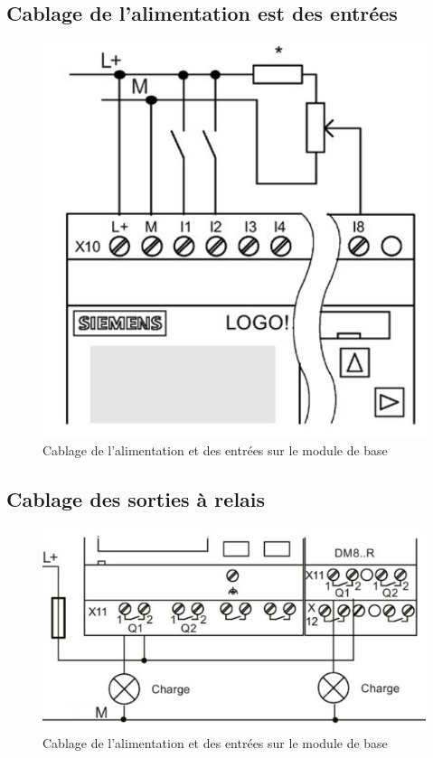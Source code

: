\subsection{Cablage de l'alimentation est des entrées}
\begin{figure}[h!]
    \centering
    \includegraphics[width=\textwidth,height=.3\textheight,keepaspectratio]{images/cablage_alimentation_entrees.png}
    \caption{Cablage de l'alimentation et des entrées sur le module de base}
\end{figure}

\subsection{Cablage des sorties à relais}
\begin{figure}[h!]
    \centering
    \includegraphics[width=\textwidth,height=.3\textheight,keepaspectratio]{images/cablage_sorties_relais.png}
    \caption{Cablage de l'alimentation et des entrées sur le module de base}
\end{figure}